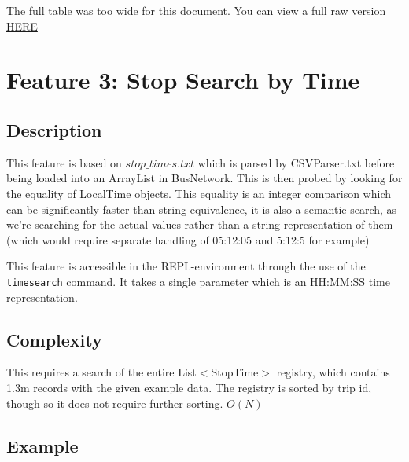\documentclass[12pt]{report}
\begin{document}
	The full table was too wide for this document. You can view a full raw version \href{https://gist.githubusercontent.com/ParadauxIO/9c44111f89cfad4fe7df1f01a1305bde/raw/cd7e87f784e10381237592c35c16c89320322b6c/gistfile1.txt}{HERE}
	
	\section{Feature 3: Stop Search by Time}
	\subsection{Description}
	This feature is based on $stop\_times.txt$ which is parsed by CSVParser.txt before being loaded into an ArrayList in BusNetwork. This is then probed by looking for the equality of LocalTime objects. This equality is an integer comparison which can be significantly faster than string equivalence, it is also a semantic search, as we're searching for the actual values rather than a string representation of them (which would require separate handling of 05:12:05 and 5:12:5 for example) \newline
	
	This feature is accessible in the REPL-environment through the use of the \texttt{timesearch} command. It takes a single parameter which is an HH:MM:SS time representation. 
	
	\subsection{Complexity}
	This requires a search of the entire List$<$StopTime$>$  registry, which contains ~ 1.3m records with the given example data. The registry is sorted by trip id, though so it does not require further sorting. $O(N)$
	
	\subsection{Example}
\end{document}
